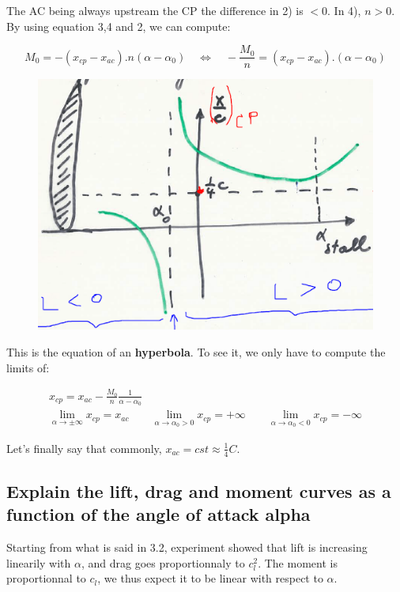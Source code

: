\documentclass[british,french,11pt, a4paper, openany]{article}
\begin{document}
The AC being always upstream the CP the difference in 2) is $<0$. In 4), $n>0$. By using equation 3,4 and 2, we can compute:

\begin{equation}
M_0 = -(x_{cp}-x_{ac}).n(\alpha - \alpha _0) \quad \Leftrightarrow \quad -\frac{M_0}{n} = (x_{cp}-x_{ac}).(\alpha - \alpha _0)
\end{equation}


\begin{figure}
	\vspace{-5mm}
	\includegraphics[scale=0.2]{ch2/17}
\end{figure}
This is the equation of an \textbf{hyperbola}. To see it, we only have to compute the limits of:

\begin{equation}
\begin{array}{c}
x_{cp} = x_{ac} - \frac{M_0}{n}\frac{1}{\alpha - \alpha _0}\\
\lim _{\alpha \rightarrow \pm\infty} x_{cp} = x_{ac} \qquad \lim _{\alpha \rightarrow \alpha _0 >0} x_{cp} = +\infty \qquad \lim _{\alpha \rightarrow \alpha _0 <0} x_{cp} = -\infty
\end{array}
\end{equation}

Let's finally say that commonly, $x_{ac} = cst \approx \frac{1}{4}C$.
\subsection{Explain the lift, drag and moment curves as a function of the angle of attack alpha}
Starting from what is said in 3.2, experiment showed that lift is increasing linearily with $\alpha$, and drag goes proportionnaly to $c_l^2$. The moment is proportionnal to $c_l$, we thus expect it to be linear with respect to $\alpha$.
\end{document}
